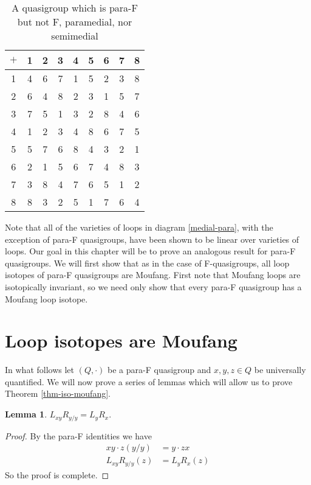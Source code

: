 \documentclass[12pt]{report}
\theoremstyle{definition}
\newtheorem{lem}[thm]{Lemma}
\newcommand{\rdv}{/}                %
\begin{document}
\begin{table}[H]
  \centering
  \begin{tabular}{c | c c c c c c c c}
    $+$ & 1 & 2 & 3 & 4 & 5 & 6 & 7 & 8\\
    \hline \hline
    1& 4& 6& 7& 1& 5& 2& 3& 8\\
    2& 6& 4& 8& 2& 3& 1& 5& 7\\
    3& 7& 5& 1& 3& 2& 8& 4& 6\\
    4& 1& 2& 3& 4& 8& 6& 7& 5\\
    5& 5& 7& 6& 8& 4& 3& 2& 1\\
    6& 2& 1& 5& 6& 7& 4& 8& 3\\
    7& 3& 8& 4& 7& 6& 5& 1& 2\\
    8& 8& 3& 2& 5& 1& 7& 6& 4 
  \end{tabular}
  \caption{A quasigroup which is para-F but not F, paramedial, nor semimedial}
\end{table}

Note that all of the varieties of loops in diagram \ref{medial-para}, with the exception of para-F
  quasigroups, have been shown to be linear over varieties of loops. Our goal in this chapter will
  be to prove an analogous result for para-F quasigroups. We will first show that as in the case of
  F-quasigroups, all loop isotopes of para-F quasigroups are Moufang. First note that Moufang loops
  are isotopically invariant, so we need only show that every para-F quasigroup has a Moufang loop isotope.

\section{Loop isotopes are Moufang}

In what follows let $(Q, \cdot)$ be a para-F quasigroup and $x, y, z\in Q$ be universally quantified.
  We will now prove a series of lemmas which will allow us to prove Theorem \ref{thm-iso-moufang}.

\begin{lem}\label{trans-lem}
  $L_{xy} R_{y\rdv y} = L_y R_x$.
\end{lem}

\begin{proof}
  By the para-F identities we have
  \begin{align*}
    xy\cdot z(y\rdv y) &= y\cdot zx\\
    L_{xy} R_{y\rdv y}(z) &= L_y R_x(z)
  \end{align*}
  So the proof is complete.
\end{proof}
\end{document}
